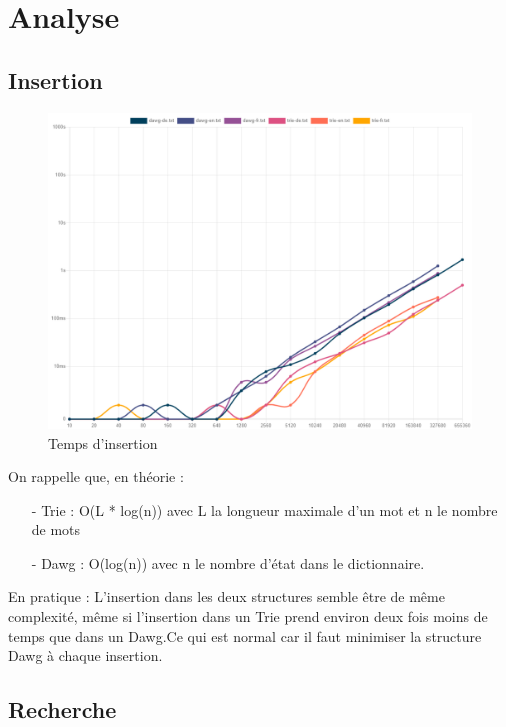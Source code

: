 \chapter{Analyse}
\graphicspath{ {./images/} }

\section{Insertion}

\begin{figure}[H]
    \centering
    \includegraphics[scale=0.5]{images/time_insert.png}
    \caption{\label{HomePage} Temps d'insertion}
\end{figure}

On rappelle que, en théorie :
\begin{itemize}
  \item[-] Trie : O(L * log(n)) avec L la longueur maximale d'un mot et n le nombre de mots
  \item[-] Dawg : O(log(n)) avec n le nombre d'état dans le dictionnaire.
\end{itemize} \leavevmode

En pratique : \medskip \newline
L'insertion dans les deux structures semble être de même complexité, même si l'insertion dans un Trie prend environ deux fois moins de temps que dans un Dawg.\newline Ce qui est normal car il faut minimiser la structure Dawg à chaque insertion.

\section{Recherche}


